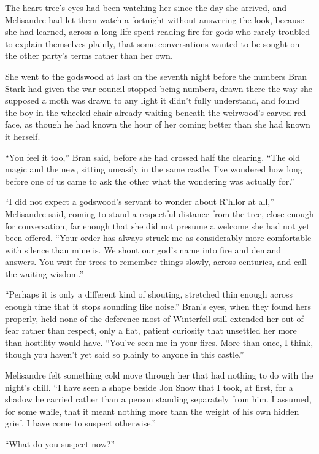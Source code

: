 The heart tree’s eyes had been watching her since the day she arrived, and Melisandre had let them watch a fortnight without answering the look, because she had learned, across a long life spent reading fire for gods who rarely troubled to explain themselves plainly, that some conversations wanted to be sought on the other party’s terms rather than her own.

She went to the godswood at last on the seventh night before the numbers Bran Stark had given the war council stopped being numbers, drawn there the way she supposed a moth was drawn to any light it didn’t fully understand, and found the boy in the wheeled chair already waiting beneath the weirwood’s carved red face, as though he had known the hour of her coming better than she had known it herself.

“You feel it too,” Bran said, before she had crossed half the clearing. “The old magic and the new, sitting uneasily in the same castle. I’ve wondered how long before one of us came to ask the other what the wondering was actually for.”

“I did not expect a godswood’s servant to wonder about R’hllor at all,” Melisandre said, coming to stand a respectful distance from the tree, close enough for conversation, far enough that she did not presume a welcome she had not yet been offered. “Your order has always struck me as considerably more comfortable with silence than mine is. We shout our god’s name into fire and demand answers. You wait for trees to remember things slowly, across centuries, and call the waiting wisdom.”

“Perhaps it is only a different kind of shouting, stretched thin enough across enough time that it stops sounding like noise.” Bran’s eyes, when they found hers properly, held none of the deference most of Winterfell still extended her out of fear rather than respect, only a flat, patient curiosity that unsettled her more than hostility would have. “You’ve seen me in your fires. More than once, I think, though you haven’t yet said so plainly to anyone in this castle.”

Melisandre felt something cold move through her that had nothing to do with the night’s chill. “I have seen a shape beside Jon Snow that I took, at first, for a shadow he carried rather than a person standing separately from him. I assumed, for some while, that it meant nothing more than the weight of his own hidden grief. I have come to suspect otherwise.”

“What do you suspect now?”

